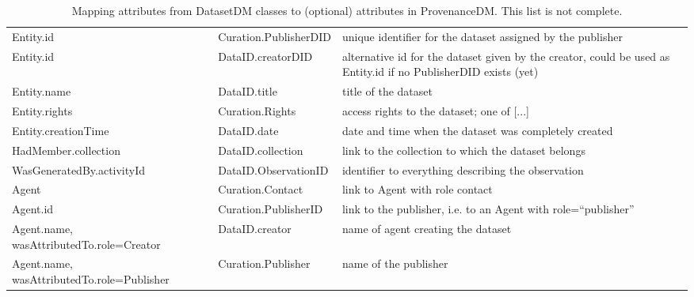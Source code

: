 \begin{table}[h]
\small
{}\textwidth
\begin{tabulary}{1.0\textwidth}{@{}Llp{5cm}@{}}
\toprule
{} &  & \\
\midrule
Entity.id                & Curation.PublisherDID  & unique identifier for the dataset assigned by the publisher\\
Entity.id                & DataID.creatorDID      &  alternative id for the dataset given by the creator, could be used as Entity.id if no PublisherDID exists (yet)\\
Entity.name              & DataID.title           & title of the dataset\\
Entity.rights            & Curation.Rights        & access rights to the dataset; one of [...]\\
Entity.creationTime      & DataID.date            & date and time when the dataset was completely created\\
HadMember.collection     & DataID.collection     & link to the collection to which the dataset belongs\\
WasGeneratedBy.activityId & DataID.ObservationID  & identifier to everything describing the observation\\
Agent                    & Curation.Contact       & link to Agent with role contact\\
Agent.id                 & Curation.PublisherID   & link to the publisher, i.e. to an Agent with role=``publisher''\\
Agent.name, \newline wasAttributedTo.role=\newline Creator               & DataID.creator         & name of agent creating the dataset\\
Agent.name, \newline wasAttributedTo.role=\newline Publisher               & Curation.Publisher     & name of the publisher\\
\bottomrule
\end{tabulary}
\caption[Mapping attributes from DatasetDM classes to attributes in ProvenanceDM]{Mapping attributes from DatasetDM classes to (optional) attributes in ProvenanceDM. This list is not complete.}
\label{tab:datasetmapping}
\end{table}

